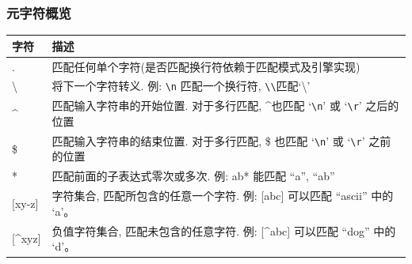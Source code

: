 \documentclass[compress]{beamer}
\begin{document}
\begin{frame}[fragile]
\frametitle{元字符概览}
\footnotesize
\begin{tabular}{|l|p{8cm}|}\hline

字符 & 描述 \\
\hline\hline

. &  匹配任何单个字符(是否匹配换行符依赖于匹配模式及引擎实现) \\
\hline

\textbackslash & 将下一个字符转义. 例: {\verb=\n=} 匹配一个换行符, {\verb=\\=}匹配`\textbackslash'\\
\hline

\textasciicircum & 匹配输入字符串的开始位置. 对于多行匹配,
\textasciicircum 也匹配 `\verb=\n=' 或 `\verb=\r=' 之后的位置 \\
\hline

\$ & 匹配输入字符串的结束位置. 对于多行匹配, \$ 也匹配 `\verb=\n='
或 `\verb=\r=' 之前的位置 \\ \hline

* & 匹配前面的子表达式零次或多次. 例: {ab*} 能匹配 ``a'', ``ab''
\\ \hline

[xy-z]  & 字符集合, 匹配所包含的任意一个字符. 例: {
[abc]} 可以匹配 ``ascii'' 中的 `a'。\\ \hline

[\textasciicircum{}xyz]  & 负值字符集合, 匹配未包含的任意字符. 例: {[\textasciicircum{}abc]} 可以匹配 ``dog'' 中的 `d'。\\
\hline
\end{tabular}
\end{frame}
\end{document}
